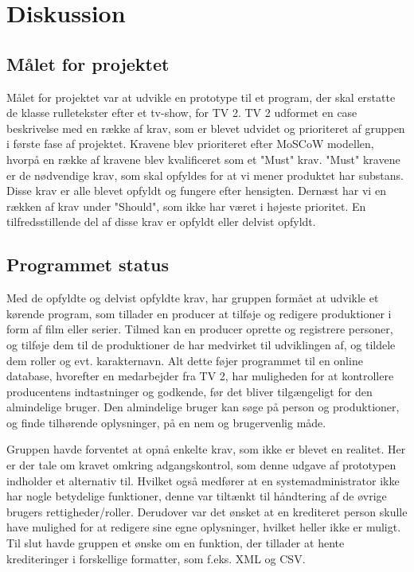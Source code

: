 \newpage
\section{Diskussion}

\subsection{Målet for projektet}%
\label{sub:malet_for_projektet}

Målet for projektet var at udvikle en prototype til et program, der skal
erstatte de klasse rulletekster efter et tv-show, for TV 2. TV 2 udformet en
case beskrivelse med en række af krav, som er blevet udvidet og prioriteret af
gruppen i første fase af projektet. Kravene blev prioriteret efter MoSCoW
modellen, hvorpå en række af kravene blev kvalificeret som et "Must" krav.
"Must" kravene er de nødvendige krav, som skal opfyldes for at vi mener
produktet har substans. Disse krav er alle blevet opfyldt og fungere efter
hensigten. Dernæst har vi en rækken af krav under "Should", som ikke har været i
højeste prioritet. En tilfredsstillende del af disse krav er opfyldt eller
delvist opfyldt.

\subsection{Programmet status}%
\label{sub:programmet}

Med de opfyldte og delvist opfyldte krav, har gruppen formået at udvikle et
kørende program, som tillader en producer at tilføje og redigere produktioner i
form af film eller serier. Tilmed kan en producer oprette og registrere
personer, og tilføje dem til de produktioner de har medvirket til udviklingen
af, og tildele dem roller og evt. karakternavn. Alt dette føjer programmet til
en online database, hvorefter en medarbejder fra TV 2, har muligheden for at
kontrollere producentens indtastninger og godkende, før det bliver tilgængeligt
for den almindelige bruger. Den almindelige bruger kan søge på person og
produktioner, og finde tilhørende oplysninger, på en nem og brugervenlig måde. 

Gruppen havde forventet at opnå enkelte krav, som ikke er blevet en realitet.
Her er der tale om kravet omkring adgangskontrol, som denne udgave af prototypen
indholder et alternativ til. Hvilket også medfører at en systemadministrator
ikke har nogle betydelige funktioner, denne var tiltænkt til håndtering af de
øvrige brugers rettigheder/roller. Derudover var det ønsket at en krediteret
person skulle have mulighed for at redigere sine egne oplysninger, hvilket
heller ikke er muligt. Til slut havde gruppen et ønske om en funktion, der
tillader at hente krediteringer i forskellige formatter, som f.eks. XML og CSV. 

